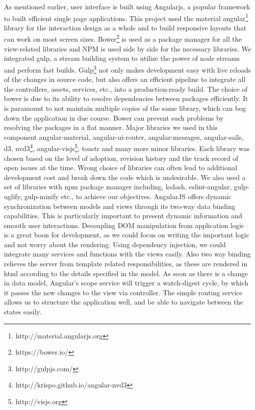 \documentclass{seal_thesis}
\begin{document}
As mentioned earlier, user interface is built using Angularjs, a popular framework to built efficient single page applications. 
This project used the material angular\footnote{http://material.angularjs.org} library for the interaction design as a whole and to build responsive layouts that can work on most screen sizes. 
Bower\footnote{https://bower.io/} is used as a package manager for all the view-related libraries and NPM is used side by side for the necessary libraries. 
We integrated gulp, a stream building system to utilize the power of node streams and perform fast builds. 
Gulp\footnote{http://gulpjs.com/} not only makes development easy with live reloads of the changes in source code, but also offers an efficient pipeline to integrate all the controllers, assets, services, etc., into a production-ready build. 
The choice of bower is due to its ability to resolve dependencies between packages efficiently.
It is paramount to not maintain multiple copies of the same library, which can bog down the application in due course. 
Bower can prevent such problems by resolving the packages in a flat manner. 
Major libraries we used in this component angular-material, angular-ui-router, angular-messages, angular-sails, d3, nvd3\footnote{http://krispo.github.io/angular-nvd3}, angular-visjs\footnote{http://visjs.org}, toastr and many more minor libraries. 
Each library was chosen based on the level of adoption, revision history and the track record of open issues at the time. 
Wrong choice of libraries can often lead to additional development cost and break down the code which is undesirable. 
We also used a set of libraries with npm package manager including, lodash, eslint-angular, gulp-uglify, gulp-minify etc., to achieve our objectives. 
AngularJS offers dynamic synchronization between models and views through its two-way data binding capabilities. 
This is particularly important to present dynamic information and smooth user interactions. 
Decoupling DOM manipulation from application logic is a great boon for development, as we could focus on writing the important logic and not worry about the rendering. 
Using dependency injection, we could integrate many services and functions with the views easily. 
Also two way binding relieves the server from template related responsibilities, as these are rendered in html according to the details specified in the model. 
As soon as there is a change in data model, Angular's scope service will trigger a watch-digest cycle, by which it passes the new changes to the view via controller. 
The simple routing service allows us to structure the application well, and be able to navigate between the states easily.
\end{document}
